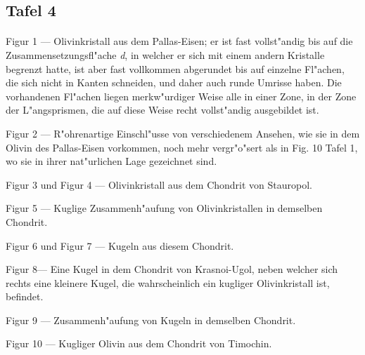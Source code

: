 \documentclass[a4paper, 11pt, oneside, german]{article}
\begin{document}
\subsection{Tafel 4}
\paragraph{}
Figur 1 --- Olivinkristall aus dem Pallas-Eisen; er ist fast vollst"andig bis auf die Zusammensetzungsfl"ache \emph{d}, in welcher er sich mit einem andern Kristalle begrenzt hatte, ist aber fast vollkommen abgerundet bis auf einzelne Fl"achen, die sich nicht in Kanten schneiden, und daher auch runde Umrisse haben. Die vorhandenen Fl"achen liegen merkw"urdiger Weise alle in einer Zone, in der Zone der L"angsprismen, die auf diese Weise recht vollst"andig ausgebildet ist.

Figur 2 --- R"ohrenartige Einschl"usse von verschiedenem Ansehen, wie sie in dem Olivin des Pallas-Eisen vorkommen, noch mehr vergr"o"sert als in Fig. 10 Tafel 1, wo sie in ihrer nat"urlichen Lage gezeichnet sind.

Figur 3 und Figur 4 --- Olivinkristall aus dem Chondrit von Stauropol.

Figur 5 --- Kuglige Zusammenh"aufung von Olivinkristallen in demselben Chondrit.

Figur 6 und Figur 7 --- Kugeln aus diesem Chondrit.

Figur 8--- Eine Kugel in dem Chondrit von Krasnoi-Ugol, neben welcher sich rechts eine kleinere Kugel, die wahrscheinlich ein kugliger Olivinkristall ist, befindet.

Figur 9 --- Zusammenh"aufung von Kugeln in demselben Chondrit.

Figur 10 --- Kugliger Olivin aus dem Chondrit von Timochin.
\end{document}
